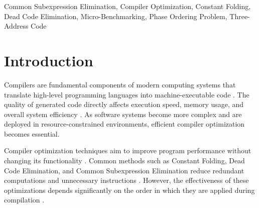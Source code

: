 \documentclass[conference]{IEEEtran}
\begin{document}
\begin{abstract}
The phase ordering problem remains a fundamental challenge in compiler optimization, where the sequence of applying optimization passes significantly affects the final program performance and code size. This project presents an empirical analysis of optimization phase ordering trade-offs using a custom-built compiler infrastructure. The compiler is designed with a handwritten lexical analyzer, a recursive-descent parser, and a Three-Address Code (3AC) intermediate representation to enable controlled experimentation. Key optimization techniques, including Constant Folding, Dead Code Elimination, and Common Subexpression Elimination, are implemented as independent and reorderable passes using a configurable pass manager. Micro-benchmark programs adapted from standard benchmark suites are used to evaluate different optimization sequences. The study measures performance using instruction count and estimated execution cycles to analyze the trade-offs between execution speed and code density. The results provide insights into how specific ordering of optimization phases can either enhance or diminish optimization effectiveness, thereby contributing to improved understanding and design of efficient compiler pipelines, particularly for small-scale and educational compiler systems.
\end{abstract}

\begin{IEEEkeywords}
Common Subexpression Elimination,
Compiler Optimization,
Constant Folding,
Dead Code Elimination,
Micro-Benchmarking,
Phase Ordering Problem,
Three-Address Code
\end{IEEEkeywords}

\section{Introduction}

Compilers are fundamental components of modern computing systems that translate high-level programming languages into machine-executable code \cite{ref21}. The quality of generated code directly affects execution speed, memory usage, and overall system efficiency \cite{ref18}. As software systems become more complex and are deployed in resource-constrained environments, efficient compiler optimization becomes essential.

Compiler optimization techniques aim to improve program performance without changing its functionality \cite{ref21}. Common methods such as Constant Folding, Dead Code Elimination, and Common Subexpression Elimination reduce redundant computations and unnecessary instructions \cite{ref18}. However, the effectiveness of these optimizations depends significantly on the order in which they are applied during compilation \cite{ref19}.
\end{document}
